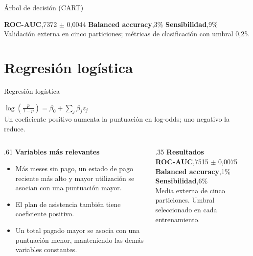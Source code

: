 \documentclass[aspectratio=169,10pt]{beamer}
\newcommand{\metric}[2]{\textbf{#1}\quad #2}
\begin{document}
\begin{frame}{Árbol de decisión (CART)}
\begin{center}
  \end{center}
  \vspace{-.08cm}
  \begin{center}
    \metric{ROC-AUC}{0,7372 $\pm$ 0,0044}\qquad
    \metric{Balanced accuracy}{67,3\%}\qquad
    \metric{Sensibilidad}{48,9\%}\\[.08cm]
    {\footnotesize Validación externa en cinco particiones; métricas de clasificación con umbral 0,25.}
  \end{center}
\end{frame}

\section{Regresión logística}
\begin{frame}{Regresión logística}
  \vspace{-.25cm}
  \begin{center}
    {\large $\displaystyle \log\!\left(\frac{p}{1-p}\right)=\beta_0+\sum_j\beta_j z_j$}\\[.18cm]
    Un coeficiente positivo aumenta la puntuación en log-odds; uno negativo la reduce.
  \end{center}
  \vspace{.4cm}
  \begin{columns}[T,onlytextwidth]
    \begin{column}{.61\textwidth}
      {\large\bfseries Variables más relevantes}
      \begin{itemize}\setlength\itemsep{.45em}
        \item Más meses sin pago, un estado de pago reciente más alto y mayor utilización se asocian con una puntuación mayor.
        \item El plan de asistencia también tiene coeficiente positivo.
        \item Un total pagado mayor se asocia con una puntuación menor, manteniendo las demás variables constantes.
      \end{itemize}
    \end{column}
    \begin{column}{.35\textwidth}
      {\large\bfseries Resultados}\\[.2cm]
      \metric{ROC-AUC}{0,7515 $\pm$ 0,0075}\\[.28cm]
      \metric{Balanced accuracy}{68,1\%}\\[.22cm]
      \metric{Sensibilidad}{59,6\%}\\[.3cm]
      {\footnotesize Media externa de cinco particiones. Umbral seleccionado en cada entrenamiento.}
    \end{column}
  \end{columns}
\end{frame}
\end{document}
